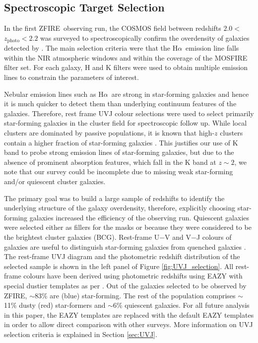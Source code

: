 \documentclass[iop]{emulateapj}
\newcommand{\Halpha}{H$\alpha$}
\newcommand{\around}{$\sim$}
\newcommand{\zphoto}{$z_{\mathrm{photo}}$}
\begin{document}
\subsection{Spectroscopic Target Selection}
\label{sec:sample_def}


In the first ZFIRE\ observing run, the COSMOS field between redshifts $2.0<$\zphoto$<2.2$ was surveyed to spectroscopically confirm the overdensity of galaxies detected by \cite{Spitler2012}. 
The main selection criteria were that the \Halpha\ emission line falls within the NIR atmospheric windows and within the coverage of the MOSFIRE filter set. 
For each galaxy, H and K filters were used to obtain multiple emission lines to constrain the parameters of  interest. 


Nebular emission lines such as \Halpha\ are strong in star-forming galaxies and hence it is much quicker to detect them than underlying continuum features of the galaxies. 
Therefore, rest frame UVJ colour selections \citep{Williams2009} were used to select primarily star-forming galaxies in the cluster field for spectroscopic follow up.
While local clusters are dominated by passive populations, it is known that high-$z$ clusters contain a higher fraction of star-forming galaxies \citep{Wen2011,Tran2010,Saintonge2008}.
This justifies our use of K band to probe strong emission lines of star-forming galaxies, but due to the absence of prominent absorption features, which fall in the K band at $z\sim2$, we note that our survey could be incomplete due to missing weak star-forming and/or quiescent cluster galaxies. 


The primary goal was to build a large sample of redshifts to identify the underlying structure of the galaxy overdensity, therefore, explicitly choosing  star-forming galaxies increased the efficiency of the observing run. 
Quiescent galaxies were selected either as fillers for the masks or because they were considered to be the brightest cluster galaxies (BCG). 
Rest-frame U$-$V and V$-$J colours of galaxies are useful to distinguish star-forming galaxies from quenched galaxies \citep{Williams2009}.
The rest-frame UVJ diagram and the photometric redshift distribution of the selected sample is shown in the left panel of Figure \ref{fig:UVJ_selection}. 
All rest-frame colours have been derived using photometric redshifts using EAZY with special dustier templates as per \citet{Spitler2014}.  
Out of the galaxies selected to be observed by ZFIRE, \around83\% are (blue) star-forming. The rest of the population comprises  \around11\% dusty (red) star-formers and \around6\% quiescent galaxies. 
For all future analysis in this paper, the \citet{Spitler2014} EAZY templates are replaced with the default EAZY templates in order to allow direct comparison with other surveys. 
More information on UVJ selection criteria is explained in Section \ref{sec:UVJ}. 
\end{document}
